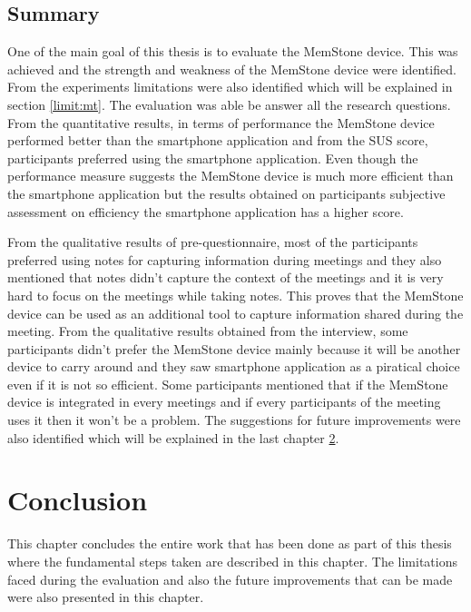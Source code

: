 \documentclass[mscthesis]{usiinfthesis}
\begin{document}
\section{Summary}
One of the main goal of this thesis is to evaluate the MemStone device. This was achieved and the strength and weakness of the MemStone device were identified. From the experiments limitations were also identified which will be explained in section \ref{limit:mt}. The evaluation was able be answer all the research questions. From the quantitative results, in terms of performance the MemStone device performed better than the smartphone application and from the SUS score, participants preferred using the smartphone application. Even though the performance measure suggests the MemStone device is much more efficient than the smartphone application but the results obtained on participants subjective assessment on efficiency the smartphone application has a higher score.  

From the qualitative results of pre-questionnaire, most of the participants preferred using notes for capturing information during meetings and they also mentioned that notes didn't capture the context of the meetings and it is very hard to focus on the meetings while taking notes. This proves that the MemStone device can be used as an additional tool to capture information shared during the meeting. From the qualitative results obtained from the interview, some participants didn't prefer the MemStone device mainly because it will be another device to carry around and they saw smartphone application as a piratical choice even if it is not so efficient. Some participants mentioned that if the MemStone device is integrated in every meetings and if every participants of the meeting uses it then it won't be a problem. The suggestions for future improvements were also identified which will be explained in the last chapter \ref{chpcon}. 

\chapter{Conclusion}
\label{chpcon}
This chapter concludes the entire work that has been done as part of this thesis where the fundamental steps taken are described in this chapter. The limitations faced during the evaluation and also the future improvements that can be made were also presented in this chapter.  
\end{document}
